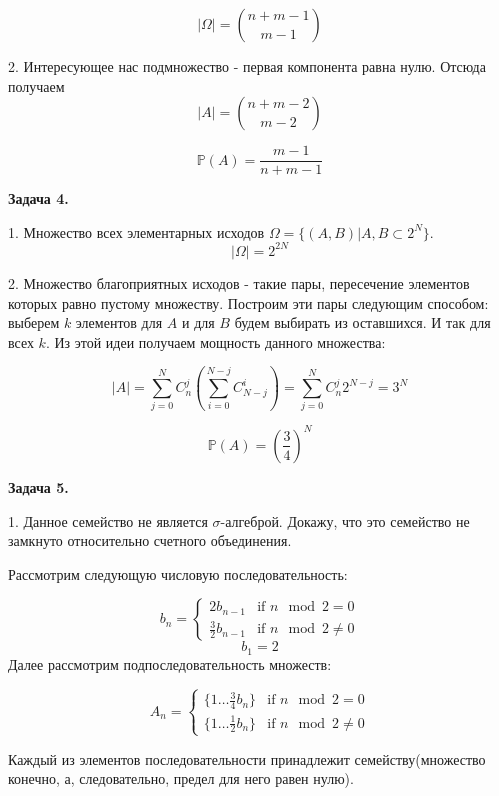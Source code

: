 \documentclass[12pt]{article}
\begin{document}
$$|\Omega| = {n+m-1 \choose m-1}$$

2. Интересующее нас подмножество - первая компонента равна нулю. Отсюда получаем $$|A| = {n+m-2 \choose m-2}$$

$$\boxed{\mathbb{P}(A)=\frac{m-1}{n+m-1}}$$


\begin{center}
\textbf{Задача 4.}
\end{center}

1. Множество всех элементарных исходов $\Omega = \{(A, B)|A, B \subset 2^N\}$. $$|\Omega|=2^{2N}$$

2. Множество благоприятных исходов - такие пары, пересечение элементов которых равно пустому множеству. Построим эти пары следующим способом: выберем $k$ элементов для $A$ и для $B$ будем выбирать из оставшихся. И так для всех $k$. Из этой идеи получаем мощность данного множества: 

$$|A| = \sum\limits_{j=0}^NC_n^j\left(\sum\limits_{i=0}^{N-j}C_{N-j}^i\right) = \sum\limits_{j=0}^NC_n^j 2^{N-j} = 3^N$$

$$\boxed{\mathbb{P}(A)=\left(\frac{3}{4}\right)^N}$$

\begin{center}
\textbf{Задача 5.}
\end{center}

1. Данное семейство не является $\sigma$-алгеброй. Докажу, что это семейство не замкнуто относительно счетного объединения.

Рассмотрим следующую числовую последовательность:

\begin{equation*}
b_n = 
 \begin{cases}
   2b_{n-1} &\text{if  $n \mod 2 = 0$}\\
   \frac{3}{2}b_{n-1} &\text{if $n \mod 2 \neq 0$}
 \end{cases}
\end{equation*}
$$b_1=2$$
Далее рассмотрим подпоследовательность множеств:

\begin{equation*}
A_n = 
 \begin{cases}
   \{1\ldots\frac{3}{4}b_n\} &\text{if  $n \mod 2 = 0$}\\
   \{1\ldots\frac{1}{2}b_n\} &\text{if $n \mod 2 \neq 0$}
 \end{cases}
\end{equation*}

Каждый из элементов последовательности принадлежит семейству(множество конечно, а, следовательно, предел для него равен нулю).
\end{document}

